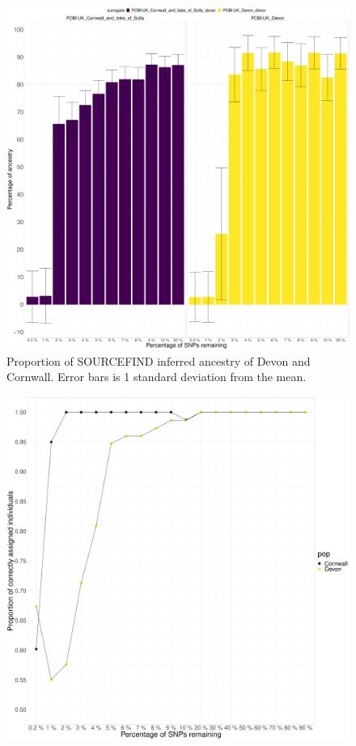 \begin{figure}[htp]
    \centering
    \includegraphics[width=1.0\textwidth]{../images/chapter1/Devon_Cornwall_SF_reduced.pdf}
    \caption{Proportion of SOURCEFIND inferred ancestry of Devon and Cornwall. Error bars is 1 standard deviation from the mean.}
    \label{fig:Devon_Cornwall_SF_reduced}
\end{figure}

\begin{figure}[htp]
    \centering
    \includegraphics[width=1.0\textwidth]{../images/chapter1/Devon_Cornwall_TVD_reduced.pdf}
    \caption{}
    \label{fig:Devon_Cornwall_TVD_reduced}
\end{figure}

